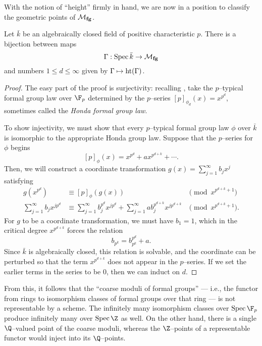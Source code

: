 With the notion of ``height'' firmly in hand, we are now in a position to classify the geometric points of $\mathcal{M}_{\mathbf{fg}}$.

\begin{theorem}\label{FGpsOverAlgClosedFields}
Let $\bar k$ be an algebraically closed field of positive characteristic $p$.  There is a bijection between maps \[\Gamma: \operatorname{Spec} \bar k \to \mathcal{M}_{\mathbf{fg}}\] and numbers $1 \le d \le \infty$ given by $\Gamma \mapsto \operatorname{ht}(\Gamma)$. 
\end{theorem}
\begin{proof}
The easy part of the proof is surjectivity: recalling , take the $p$--typical formal group law over $\F_p$ determined by the $p$--series $[p]_{\phi_d}(x) = x^{p^d}$, sometimes called the \textit{Honda formal group law}.

To show injectivity, we must show that every $p$--typical formal group law $\phi$ over $\bar k$ is isomorphic to the appropriate Honda group law.  Suppose that the $p$--series for $\phi$ begins \[[p]_\phi(x) = x^{p^d} + a x^{p^{d+k}} + \cdots. \]  Then, we will construct a coordinate transformation $g(x) = \sum_{j=1}^\infty b_j x^j$ satisfying
\begin{align*}
g(x^{p^d}) & \equiv [p]_\phi(g(x)) & \pmod{x^{p^{d+k} + 1}} \\
\sum_{j=1}^\infty b_j x^{jp^d} & \equiv \sum_{j=1}^\infty b_j^{p^d} x^{jp^d} + \sum_{j=1}^\infty a b_j^{p^{d+k}} x^{jp^{d+k}} & \pmod{x^{p^{d+k} + 1}}.
\end{align*}
For $g$ to be a coordinate transformation, we must have $b_1 = 1$, which in the critical degree $x^{p^{d+k}}$ forces the relation \[b_{p^k} = b_{p^k}^{p^d} + a.\]  Since $\bar k$ is algebraically closed, this relation is solvable, and the coordinate can be perturbed so that the term $x^{p^{d+k}}$ does not appear in the $p$--series.  If we set the earlier terms in the series to be $0$, then we can induct on $d$.
\end{proof}

\begin{remark}
From this, it follows that the ``coarse moduli of formal groups'' --- i.e., the functor from rings to isomorphism classes of formal groups over that ring --- is not representable by a scheme.  The infinitely many isomorphism classes over $\Spec \F_p$ produce infinitely many over $\Spec \Z$ as well.  On the other hand, there is a single $\Q$--valued point of the coarse moduli, whereas the $\Z$--points of a representable functor would inject into its $\Q$--points.
\end{remark}



